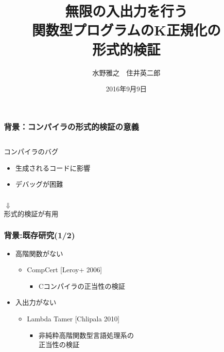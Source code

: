 \documentclass[dvipdfmx,cjk,xcolor=dvipsnames,envcountsect,notheorems,12pt]{beamer}
\title{\alert<2>{無限の入出力}を行う\\\alert<2>{関数型プログラム}のK正規化の\\形式的検証}
\author{水野雅之　住井英二郎}
\institute[東北大学　住井・松田研]{東北大学 大学院情報科学研究科}%
\date{2016年9月9日}
\theoremstyle{definition}
\begin{document}
\frame[plain]{\titlepage}%

\begin{frame}
	\frametitle{背景：コンパイラの形式的検証の意義}
	\begin{center}
		\LARGE 
		\begin{columns}
			\begin{column}{0.8\textwidth}
				\begin{itembox}[c]{コンパイラのバグ}
					\begin{itemize}
						\item 生成されるコードに影響
						\item デバッグが困難
					\end{itemize}
				\end{itembox}
			\end{column}
		\end{columns}
		$\Downarrow$\\
		形式的検証が有用
	\end{center}
\end{frame}

\begin{frame}
	\frametitle{背景:既存研究(1/2)}
	\begin{itemize}
		\item 高階関数がない
			\begin{itemize}
				\item CompCert [Leroy+ 2006]
					\begin{itemize}
						\item Cコンパイラの正当性の検証
					\end{itemize}
			\end{itemize}
		\item 入出力がない
			\begin{itemize}
				\item Lambda Tamer [Chlipala 2010]
					\begin{itemize}
						\item 非純粋高階関数型言語処理系の\\正当性の検証
					\end{itemize}
			\end{itemize}
	\end{itemize}
\end{frame}
\end{document}

